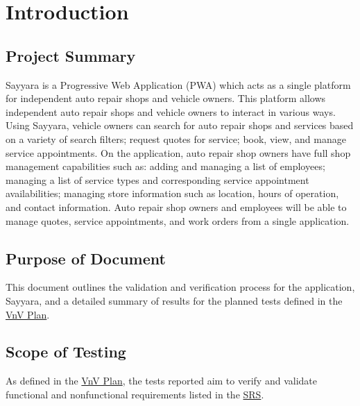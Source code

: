 \documentclass[12pt, titlepage]{article}
\begin{document}
\newpage

\tableofcontents

\listoftables %

\listoffigures %

\newpage


\section{Introduction}

\subsection{Project Summary}

Sayyara is a Progressive Web Application (PWA) which acts as a single platform for independent auto
repair shops and vehicle owners. This platform allows independent auto repair shops and vehicle
owners to interact in various ways. Using Sayyara, vehicle owners can search for auto repair shops
and services based on a variety of search filters; request quotes for service; book, view, and
manage service appointments. On the application, auto repair shop owners have full shop management
capabilities such as: adding and managing a list of employees; managing a list of service types and
corresponding service appointment availabilities; managing store information such as location,
hours of operation, and contact information. Auto repair shop owners and employees will be able to
manage quotes, service appointments, and work orders from a single application.

\subsection{Purpose of Document}
This document outlines the validation and verification process for the application, Sayyara, and a
detailed summary of results for the planned tests defined in the
\href{https://github.com/arkinmodi/project-sayyara/blob/main/docs/VnVPlan/VnVPlan.pdf}{VnV Plan}.

\subsection{Scope of Testing}
As defined in the
\href{https://github.com/arkinmodi/project-sayyara/blob/main/docs/VnVPlan/VnVPlan.pdf}{VnV Plan},
the tests reported aim to verify and validate functional and nonfunctional requirements listed in
the \href{https://github.com/arkinmodi/project-sayyara/blob/main/docs/SRS/SRS.pdf}{SRS}.
\end{document}
